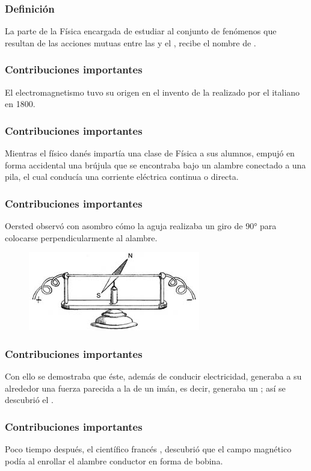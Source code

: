 \documentclass[14pt]{beamer}
\begin{document}
\begin{frame}
\frametitle{Definición}
La parte de la Física encargada de estudiar al conjunto de fenómenos que resultan de las acciones mutuas entre las  y el , recibe el nombre de .
\end{frame}
\begin{frame}
\frametitle{Contribuciones importantes}
El electromagnetismo tuvo su origen en el invento de la  realizado por el italiano  en 1800.
\end{frame}
\begin{frame}
\frametitle{Contribuciones importantes}
Mientras el físico danés  impartía una clase de Física a sus alumnos, \pause empujó en forma accidental una brújula que se encontraba bajo un alambre conectado a una pila, \pause el cual conducía una corriente eléctrica continua o directa.
\end{frame}
\begin{frame}
\frametitle{Contribuciones importantes}
Oersted observó con asombro cómo la aguja realizaba un giro de \ang{90} para colocarse perpendicularmente al alambre.
\pause
\begin{figure}
    \centering
    \includegraphics[scale=0.8]{Imagenes/Electromagnetismo_01.jpg}
\end{figure}
\end{frame}
\begin{frame}
\frametitle{Contribuciones importantes}
Con ello se demostraba que éste, además de conducir electricidad, generaba a su alrededor una fuerza parecida a la de un imán, \pause es decir, generaba un ; \pause así se descubrió el .
\end{frame}
\begin{frame}
\frametitle{Contribuciones importantes}    
Poco tiempo después, el científico francés , descubrió que el campo magnético podía  al enrollar el alambre conductor en forma de bobina.
\end{frame}
\end{document}
